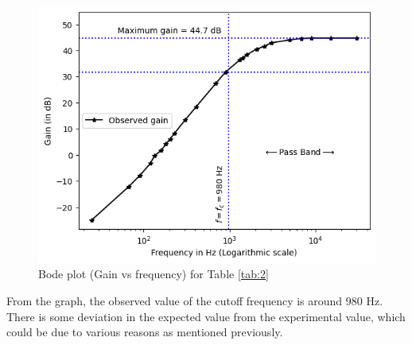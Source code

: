     
    \begin{figure}[H]
        \centering
        \includegraphics[width=1\columnwidth]{images/high_pass_output.png}
        \caption{Bode plot (Gain vs frequency) for Table \ref{tab:2}}
        \label{highoutput}
    \end{figure}

From the graph, the observed value of the cutoff frequency is around 980 Hz. There is some deviation in the expected value from the experimental value, which could be due to various reasons as mentioned previously. 

